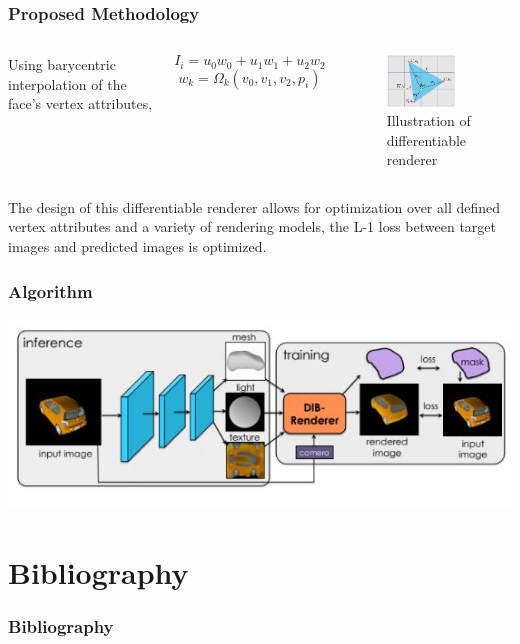 \documentclass{beamer}
\begin{document}
	\begin{frame}
		\frametitle{Proposed Methodology}
		\begin{columns}
			Using barycentric interpolation of the face's vertex attributes,
			
	
			\begin{equation}
				I_{i} = u_{0}w_{0} + u_{1}w_{1} + u_{2}w_{2}
			\end{equation}
			\begin{equation}
				w_{k} = \Omega_{k} (v_{0} , v_{1} , v_{2} , p_{i})
			\end{equation}
			
			
			
			\begin{figure}
				\includegraphics[width=0.8\textwidth]{imgs/dr.jpg}
				\caption{Illustration of differentiable renderer}
				
			\end{figure}
			
		\end{columns}
		
		The design of this differentiable renderer allows for optimization over all defined vertex attributes and a variety of rendering models, the L-1 loss between target images and predicted images is optimized.
	\end{frame}
	
	\begin{frame}
	\frametitle{Algorithm}
		\includegraphics[width=\textwidth]{imgs/workflow.jpg}
	\end{frame}
	
	\section{Bibliography}
	\begin{frame}
		\frametitle{Bibliography}
		\printbibliography
	\end{frame}
	
\end{document}
